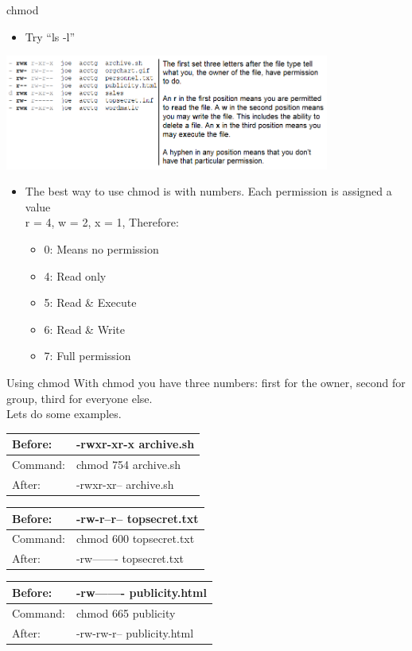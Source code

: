 \documentclass{beamer}
\begin{document}
\begin{frame}{chmod}
\begin{itemize}
\item Try ``ls -l''
\end{itemize}
\includegraphics[width=0.8\textwidth]{../imgs/chmod.png}
\begin{itemize}
\item The best way to use chmod is with numbers.  Each permission is assigned a value\\
r = 4, w = 2, x = 1, Therefore:
\begin{itemize}
\item 0: Means no permission
\item 4: Read only
\item 5: Read \& Execute
\item 6: Read \& Write
\item 7: Full permission
\end{itemize}
\end{itemize}
\end{frame}

\begin{frame}{Using chmod}
With chmod you have three numbers: first for the owner, second for group, third for everyone else.\\
Lets do some examples.
\begin{tabular}{| l | l |}
\hline
Before: & -rwxr-xr-x  archive.sh \\ \hline
Command: & chmod 754 archive.sh \\ \hline
After: & -rwxr-xr-- archive.sh \\
\hline
\end{tabular}
\begin{tabular}{| l | l |}
\hline
Before: & -rw-r--r-- topsecret.txt \\ \hline
Command: & chmod 600 topsecret.txt \\ \hline
After: & -rw------- topsecret.txt \\
\hline
\end{tabular}
\begin{tabular}{| l | l |}
\hline
Before: & -rw-------  publicity.html  \\ \hline
Command: & chmod 665 publicity \\ \hline
After: & -rw-rw-r--  publicity.html \\
\hline
\end{tabular}
\end{frame}
\end{document}

